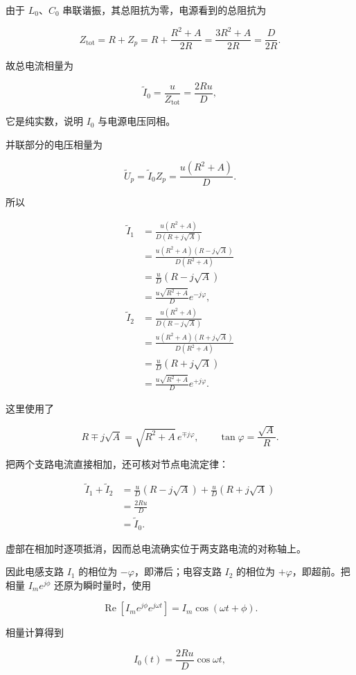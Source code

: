 \documentclass[12pt,a4paper,UTF8]{ctexart}
\begin{document}
由于 \(L_0\)、\(C_0\) 串联谐振，其总阻抗为零，电源看到的总阻抗为

\[Z_{\mathrm{tot}}
=R+Z_p
=R+\frac{R^2+A}{2R}
=\frac{3R^2+A}{2R}
=\frac D{2R}.\]

故总电流相量为

\[\widetilde I_0=\frac{u}{Z_{\mathrm{tot}}}
=\frac{2Ru}{D},\]

它是纯实数，说明 \(I_0\) 与电源电压同相。

并联部分的电压相量为

\[\widetilde U_p=\widetilde I_0Z_p
=\frac{u(R^2+A)}{D}.\]

所以

\[\begin{aligned}
\widetilde I_1
&=\frac{u(R^2+A)}{D(R+j\sqrt A)}\\
&=\frac{u(R^2+A)(R-j\sqrt A)}{D(R^2+A)}\\
&=\frac uD(R-j\sqrt A)\\
&=\frac{u\sqrt{R^2+A}}{D}e^{-j\varphi},\\
\widetilde I_2
&=\frac{u(R^2+A)}{D(R-j\sqrt A)}\\
&=\frac{u(R^2+A)(R+j\sqrt A)}{D(R^2+A)}\\
&=\frac uD(R+j\sqrt A)\\
&=\frac{u\sqrt{R^2+A}}{D}e^{+j\varphi}.
\end{aligned}\]

这里使用了

\[R\mp j\sqrt A=\sqrt{R^2+A}\,e^{\mp j\varphi},
\qquad \tan\varphi=\frac{\sqrt A}{R}.\]

把两个支路电流直接相加，还可核对节点电流定律：

\[\begin{aligned}
\widetilde I_1+\widetilde I_2
&=\frac uD(R-j\sqrt A)+\frac uD(R+j\sqrt A)\\
&=\frac{2Ru}{D}\\
&=\widetilde I_0.
\end{aligned}\]

虚部在相加时逐项抵消，因而总电流确实位于两支路电流的对称轴上。

因此电感支路 \(I_1\) 的相位为 \(-\varphi\)，即滞后；电容支路 \(I_2\)
的相位为 \(+\varphi\)，即超前。把相量 \(I_m e^{j\phi}\)
还原为瞬时量时，使用

\[\operatorname{Re}\!\left[I_me^{j\phi}e^{j\omega t}\right]
=I_m\cos(\omega t+\phi).\]

相量计算得到

\[\boxed{I_0(t)=\frac{2Ru}{D}\cos\omega t},\]
\end{document}
